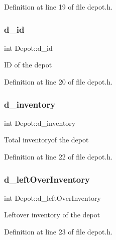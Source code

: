 Definition at line 19 of file depot.\+h.

\mbox{\label{class_depot_a1a1a1a9e2d0952f6446247f706fcaa97}} 
\subsubsection{\texorpdfstring{d\+\_\+id}{d\_id}}
{\footnotesize\ttfamily int Depot\+::d\+\_\+id\hspace{0.3cm}{\ttfamily [private]}}

ID of the depot 

Definition at line 20 of file depot.\+h.

\mbox{\label{class_depot_acf5df9f1ee607052c50fc2f56d167609}} 
\subsubsection{\texorpdfstring{d\+\_\+inventory}{d\_inventory}}
{\footnotesize\ttfamily int Depot\+::d\+\_\+inventory\hspace{0.3cm}{\ttfamily [private]}}

Total inventoryof the depot 

Definition at line 22 of file depot.\+h.

\mbox{\label{class_depot_af81ace5d9d43b962c966f397b527ee48}} 
\subsubsection{\texorpdfstring{d\+\_\+left\+Over\+Inventory}{d\_leftOverInventory}}
{\footnotesize\ttfamily int Depot\+::d\+\_\+left\+Over\+Inventory\hspace{0.3cm}{\ttfamily [private]}}

Leftover inventory of the depot 

Definition at line 23 of file depot.\+h.

\mbox{\label{class_depot_a3037941bb91b32aed2a37bf39cda0917}} 
